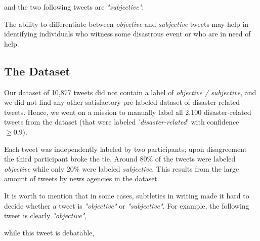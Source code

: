 \documentclass[letterpaper,twocolumn,10pt]{article}
\begin{document}
and the two following tweets are \textit{"subjective"}:

\begin{center}
	\parbox{190pt}{}
\end{center}

\begin{center}
	\parbox{190pt}{}
\end{center}

The ability to differentiate between \textit{objective} and \textit{subjective} tweets may help in identifying individuals who witness some disastrous event or who are in need of help.

\subsection{The Dataset}

Our dataset of 10,877 tweets did not contain a label of \textit{objective / subjective}, and we did not find any other satisfactory pre-labeled dataset of disaster-related tweets. Hence, we went on a mission to manually label all 2,100 disaster-related tweets from the dataset (that were labeled '\textit{disaster-related}' with confidence $ \ge 0.9 $).

Each tweet was independently labeled by two participants; upon disagreement the third participant broke the tie. Around 80\% of the tweets were labeled \textit{objective} while only 20\% were labeled \textit{subjective}. This results from the large amount of tweets by news agencies in the dataset.

It is worth to mention that in some cases, subtleties in writing made it hard to decide whether a tweet is \textit{"objective"} or \textit{"subjective"}. For example, the following tweet is clearly \textit{"objective"},

\begin{center}
	\parbox{190pt}{}
\end{center}

while this tweet is debatable,

\begin{center}
	\parbox{190pt}{}
\end{center}
\end{document}
